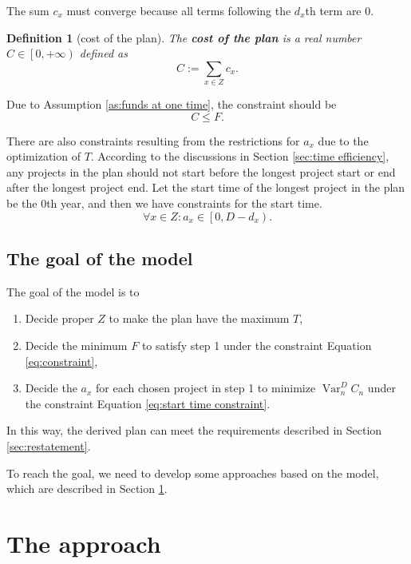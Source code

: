 \documentclass{article}
\DeclareMathOperator*{\var}{Var}
\newtheorem{definition}{Definition}
\begin{document}
The sum $c_x$ must converge because all terms following the $d_x$th term are $0$.

\begin{definition}[cost of the plan]
The \textbf{cost of the plan} is a real number $C\in\left[0,+\infty\right)$ defined as
\begin{equation}
C:=\sum_{x\in Z}c_x.
\end{equation}
\end{definition}

Due to Assumption \ref{as:funds at one time}, the constraint should be
\begin{equation}
\label{eq:constraint}
C\le F.
\end{equation}

There are also constraints resulting from the restrictions for $a_x$ due to the optimization of $T$.
According to the discussions in Section \ref{sec:time efficiency}, any projects in the plan should not start before the longest project start or end after the longest project end.
Let the start time of the longest project in the plan be the $0$th year, and then we have constraints for the start time.
\begin{equation}
\label{eq:start time constraint}
\forall x\in Z:a_x\in\left[0,D-d_x\right).
\end{equation}

\subsection{The goal of the model}
\label{sec:goal}

The goal of the model is to
\begin{enumerate}
\item Decide proper $Z$ to make the plan have the maximum $T$,
\item Decide the minimum $F$ to satisfy step 1 under the constraint Equation \ref{eq:constraint},
\item Decide the $a_x$ for each chosen project in step 1 to minimize $\var_n^DC_n$ under the constraint Equation \ref{eq:start time constraint}.
\end{enumerate}

In this way, the derived plan can meet the requirements described in Section \ref{sec:restatement}.

To reach the goal, we need to develop some approaches based on the model,
which are described in Section \ref{sec:approach}.

\section{The approach}
\label{sec:approach}
\end{document}
